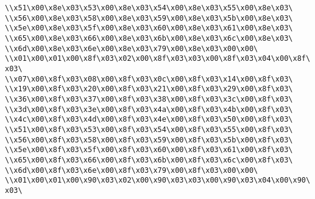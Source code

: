 \verb|\\x51\x00\x8e\x03\x53\x00\x8e\x03\x54\x00\x8e\x03\x55\x00\x8e\x03\|\newline
\verb|\\x56\x00\x8e\x03\x58\x00\x8e\x03\x59\x00\x8e\x03\x5b\x00\x8e\x03\|\newline
\verb|\\x5e\x00\x8e\x03\x5f\x00\x8e\x03\x60\x00\x8e\x03\x61\x00\x8e\x03\|\newline
\verb|\\x65\x00\x8e\x03\x66\x00\x8e\x03\x6b\x00\x8e\x03\x6c\x00\x8e\x03\|\newline
\verb|\\x6d\x00\x8e\x03\x6e\x00\x8e\x03\x79\x00\x8e\x03\x00\x00\|\newline
\verb|\\x01\x00\x01\x00\x8f\x03\x02\x00\x8f\x03\x03\x00\x8f\x03\x04\x00\x8f\x03\|\newline
\verb|\\x07\x00\x8f\x03\x08\x00\x8f\x03\x0c\x00\x8f\x03\x14\x00\x8f\x03\|\newline
\verb|\\x19\x00\x8f\x03\x20\x00\x8f\x03\x21\x00\x8f\x03\x29\x00\x8f\x03\|\newline
\verb|\\x36\x00\x8f\x03\x37\x00\x8f\x03\x38\x00\x8f\x03\x3c\x00\x8f\x03\|\newline
\verb|\\x3d\x00\x8f\x03\x3e\x00\x8f\x03\x4a\x00\x8f\x03\x4b\x00\x8f\x03\|\newline
\verb|\\x4c\x00\x8f\x03\x4d\x00\x8f\x03\x4e\x00\x8f\x03\x50\x00\x8f\x03\|\newline
\verb|\\x51\x00\x8f\x03\x53\x00\x8f\x03\x54\x00\x8f\x03\x55\x00\x8f\x03\|\newline
\verb|\\x56\x00\x8f\x03\x58\x00\x8f\x03\x59\x00\x8f\x03\x5b\x00\x8f\x03\|\newline
\verb|\\x5e\x00\x8f\x03\x5f\x00\x8f\x03\x60\x00\x8f\x03\x61\x00\x8f\x03\|\newline
\verb|\\x65\x00\x8f\x03\x66\x00\x8f\x03\x6b\x00\x8f\x03\x6c\x00\x8f\x03\|\newline
\verb|\\x6d\x00\x8f\x03\x6e\x00\x8f\x03\x79\x00\x8f\x03\x00\x00\|\newline
\verb|\\x01\x00\x01\x00\x90\x03\x02\x00\x90\x03\x03\x00\x90\x03\x04\x00\x90\x03\|\newline
